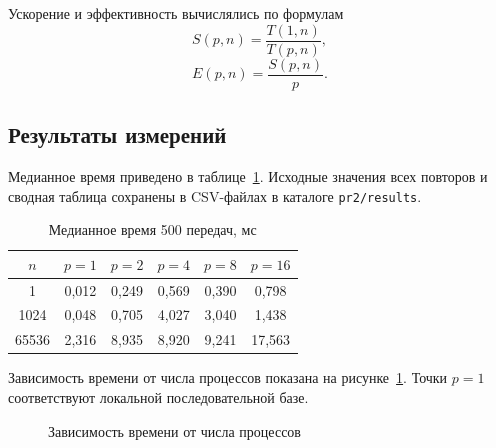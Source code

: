 \documentclass[14pt,a4paper]{extarticle}
\begin{document}
Ускорение и эффективность вычислялись по формулам
\begin{equation}
\label{eq:speedup}
 S(p,n)=\frac{T(1,n)}{T(p,n)},
\end{equation}
\begin{equation}
\label{eq:efficiency}
 E(p,n)=\frac{S(p,n)}{p}.
\end{equation}

\subsection{Результаты измерений}

Медианное время приведено в таблице~\ref{tab:benchmark-time}. Исходные
значения всех повторов и сводная таблица сохранены в CSV-файлах в каталоге
\texttt{pr2/results}.

\begin{table}[H]
\caption{Медианное время 500 передач, мс}
\label{tab:benchmark-time}
\centering
\begin{tabular}{c|ccccc}
$n$ & $p=1$ & $p=2$ & $p=4$ & $p=8$ & $p=16$ \\
\hline
1     & 0,012 & 0,249 & 0,569 & 0,390 & 0,798 \\
1024  & 0,048 & 0,705 & 4,027 & 3,040 & 1,438 \\
65536 & 2,316 & 8,935 & 8,920 & 9,241 & 17,563
\end{tabular}
\end{table}

Зависимость времени от числа процессов показана на
рисунке~\ref{fig:time-processes}. Точки $p=1$ соответствуют локальной
последовательной базе.

\begin{figure}[H]
\centering
{}
\caption{Зависимость времени от числа процессов}
\label{fig:time-processes}
\end{figure}
\end{document}
